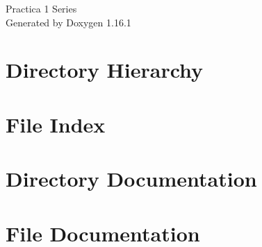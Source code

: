 \documentclass[twoside]{book}
\newcommand{\+}{\discretionary{\mbox{\scriptsize$\hookleftarrow$}}{}{}}
\newcommand{\clearemptydoublepage}{%
    \newpage{\pagestyle{empty}\cleardoublepage}%
  }
\begin{document}
  \raggedbottom
    \hypersetup{pageanchor=false,
                bookmarksnumbered=true,
                pdfencoding=unicode
               }
  \begin{titlepage}
  \vspace*{7cm}
  \begin{center}%
  {\Large Practica 1 Series}\\
  \vspace*{1cm}
  {\large Generated by Doxygen 1.16.1}\\
  \end{center}
  \end{titlepage}
  \clearemptydoublepage
  \tableofcontents
  \clearemptydoublepage
  \hypersetup{pageanchor=true}
\chapter{Directory Hierarchy}

\chapter{File Index}

\chapter{Directory Documentation}


\chapter{File Documentation}








  \backmatter
  \newpage
  \clearemptydoublepage
  \printindex
\end{document}
